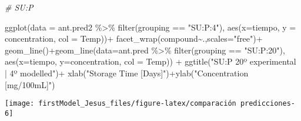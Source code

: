 \documentclass[
]{article}
\newenvironment{Shaded}{\begin{snugshade}}{\end{snugshade}}
\newcommand{\AttributeTok}[1]{\textcolor[rgb]{0.77,0.63,0.00}{#1}}
\newcommand{\CommentTok}[1]{\textcolor[rgb]{0.56,0.35,0.01}{\textit{#1}}}
\newcommand{\FunctionTok}[1]{\textcolor[rgb]{0.00,0.00,0.00}{#1}}
\newcommand{\NormalTok}[1]{#1}
\newcommand{\SpecialCharTok}[1]{\textcolor[rgb]{0.00,0.00,0.00}{#1}}
\newcommand{\StringTok}[1]{\textcolor[rgb]{0.31,0.60,0.02}{#1}}
\begin{document}
\begin{Shaded}
\begin{Highlighting}[]
\CommentTok{\# SU:P}

\FunctionTok{ggplot}\NormalTok{(}\AttributeTok{data =}\NormalTok{ ant.pred2 }\SpecialCharTok{\%\textgreater{}\%} \FunctionTok{filter}\NormalTok{(grouping }\SpecialCharTok{==} \StringTok{"SU:P:4"}\NormalTok{), }\FunctionTok{aes}\NormalTok{(}\AttributeTok{x=}\NormalTok{tiempo, }\AttributeTok{y =}\NormalTok{ concentration, }\AttributeTok{col =}\NormalTok{ Temp))}\SpecialCharTok{+}
  \FunctionTok{facet\_wrap}\NormalTok{(compound}\SpecialCharTok{\textasciitilde{}}\NormalTok{.,}\AttributeTok{scales=}\StringTok{"free"}\NormalTok{)}\SpecialCharTok{+}
  \FunctionTok{geom\_line}\NormalTok{()}\SpecialCharTok{+}\FunctionTok{geom\_line}\NormalTok{(}\AttributeTok{data=}\NormalTok{ant.pred }\SpecialCharTok{\%\textgreater{}\%} \FunctionTok{filter}\NormalTok{(grouping }\SpecialCharTok{==} \StringTok{"SU:P:20"}\NormalTok{), }\FunctionTok{aes}\NormalTok{(}\AttributeTok{x=}\NormalTok{tiempo, }\AttributeTok{y=}\NormalTok{concentration, }\AttributeTok{col =}\NormalTok{ Temp)) }\SpecialCharTok{+}
  \FunctionTok{ggtitle}\NormalTok{(}\StringTok{"SU:P 20º experimental | 4º modelled"}\NormalTok{)}\SpecialCharTok{+} \FunctionTok{xlab}\NormalTok{(}\StringTok{"Storage Time [Days]"}\NormalTok{)}\SpecialCharTok{+}\FunctionTok{ylab}\NormalTok{(}\StringTok{"Concentration [mg/100mL]"}\NormalTok{)}
\end{Highlighting}
\end{Shaded}

\begin{center}\texttt{[image: firstModel\_Jesus\_files/figure-latex/comparación predicciones-6]} \end{center}
\end{document}
